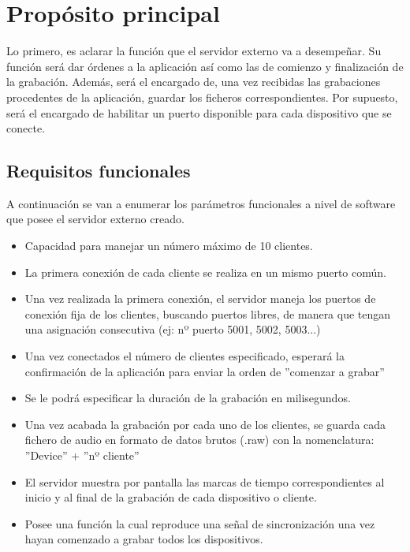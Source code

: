 \documentclass[a4paper,11pt]{book}
\begin{document}
	
		\section{Propósito principal}
			Lo primero, es aclarar la función que el servidor externo va a desempeñar. Su función será dar órdenes a la aplicación así como las de comienzo y finalización de la grabación. Además, será el encargado de, una vez recibidas las grabaciones procedentes de la aplicación, guardar los ficheros correspondientes. Por supuesto, será el encargado de habilitar un puerto disponible para cada dispositivo que se conecte.
			
			
			\subsection{Requisitos funcionales}
				A continuación se van a enumerar los parámetros funcionales a nivel de software que posee el servidor externo creado.
				
				\begin{itemize}
				\item Capacidad para manejar un número máximo de 10 clientes.
				\item La primera conexión de cada cliente se realiza en un mismo puerto común.
				\item Una vez realizada la primera conexión, el servidor maneja los puertos de conexión fija de los clientes, buscando puertos libres, de manera que tengan una asignación consecutiva (ej: nº puerto 5001, 5002, 5003...)
				\item Una vez conectados el número de clientes especificado, esperará la confirmación de la aplicación para enviar la orden de ''comenzar a grabar''
				\item Se le podrá especificar la duración de la grabación en milisegundos.
				\item Una vez acabada la grabación por cada uno de los clientes, se guarda cada fichero de audio en formato de datos brutos (.raw) con la nomenclatura: ''Device'' + ''nº cliente''
				\item El servidor muestra por pantalla las marcas de tiempo correspondientes al inicio y al final de la grabación de cada dispositivo o cliente.
				\item Posee una función la cual reproduce una señal de sincronización una vez hayan comenzado a grabar todos los dispositivos.
				\end{itemize}
			
\end{document}
